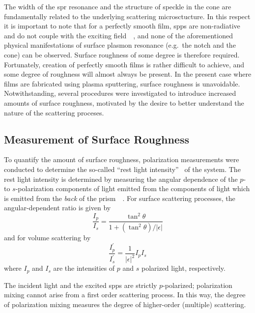 The width of the \gls{spr} resonance and the structure of speckle in the cone are
fundamentally related to the underlying scattering microsctucture.  In this
respect it is important to note that for a perfectly smooth film, \glspl{spp} are
non-radiative and do not couple with the exciting
field~\cite{johansson1990theory}~\cite{otto1968excitation}, and none of the
aforementioned physical manifestations of surface plasmon resonance (e.g.\ the
notch and the cone) can be observed.  Surface roughness of some degree is
therefore required.  Fortunately, creation of perfectly smooth films is rather
difficult to achieve, and some degree of roughness will almost always be
present.  In the present case where films are fabricated using plasma
sputtering, surface roughness is unavoidable.  Notwithstanding, several
procedures were investigated to introduce increased amounts of surface
roughness, motivated by the desire to better understand the nature of the
scattering proceses.

\subsection{Measurement of Surface Roughness}
To quantify the amount of surface roughness, polarization measurements were
conducted to determine the so-called ``rest light
intensity''~\cite{horstmann1977multiple} of the system.  The rest light
intensity is determined by measuring the angular dependence of the $p$- to
$s$-polarization components of light emitted from the components of light
which is emitted from the \textit{back} of the
prism~\cite{kretschmann1972decay}~\cite{hornauer1976light}.  For surface scattering processes, the
angular-dependent ratio is given by~\cite{kretschmann1972thesis}
\begin{equation}
  \frac{I_p}{I_s} = \frac{\tan^2\theta}{1+(\tan^2\theta)/|\epsilon|}
  \label{eqn:ipssurface}
\end{equation}
and for volume scattering by
\begin{equation}
  \frac{I^\prime_p}{I^\prime_s} = \frac{1}{|\epsilon|^2} I_p I_s
  \label{eqn:ipsvolume}
\end{equation}
where $I_p$ and $I_s$ are the intensities of $p$ and $s$ polarized light,
respectively.

The incident light and the excited \glspl{spp} are strictly $p$-polarized;
polarization mixing cannot arise from a first order scattering process.
In this way, the degree of polarization mixing measures the degree of
higher-order (multiple) scattering.

